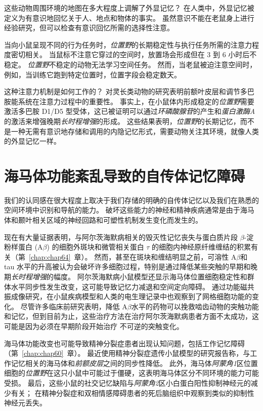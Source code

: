 这些动物周围环境的地图在多大程度上调解了外显记忆？
在人类中，外显记忆被定义为有意识地回忆关于人、地点和物体的事实。
虽然意识不能在老鼠身上进行经验研究，但可以检查有意识回忆所需的选择性注意。


当向小鼠呈现不同的行为任务时，\textit{位置野}的长期稳定性与执行任务所需的注意力程度密切相关。
当鼠标不注意它穿过的空间时，放置场会形成但在 3 到 6 小时后不稳定。
\textit{位置野}不稳定的动物无法学习空间任务。
然而，当老鼠被迫注意空间时，例如，当训练它跑到特定位置时，位置字段会稳定数天。


这种注意力机制是如何工作的？
对灵长类动物的研究表明前额叶皮层和调节多巴胺能系统在注意力过程中的重要性。
事实上，在小鼠体内形成稳定的\textit{位置野}需要激活多巴胺 D1/D5 型受体，这已被证明可以通过\textit{环磷酸腺苷}的产生和\textit{蛋白激酶A}的激活来增强晚期\textit{长时程增强}的形成。
这些结果表明，\textit{位置野}的长期记忆，而不是一种无需有意识地存储和调用的内隐记忆形式，需要动物关注其环境，就像人类的外显记忆一样。



\section{海马体功能紊乱导致的自传体记忆障碍}

我们的认同感在很大程度上取决于我们存储的明确的自传体记忆以及我们在熟悉的空间环境中识别和导航的能力。
破坏这些能力的神经和精神疾病通常是由于海马体和颞叶相关区域的神经回路和可塑性机制发生变化而发生的。


现在有大量证据表明，与阿尔茨海默病相关的毁灭性记忆丧失与蛋白质片段 $\beta$-淀粉样蛋白 (A$\beta$) 的细胞外斑块和微管相关蛋白 $ \tau $ 的细胞内神经原纤维缠结的积累有关（第~\ref{chap:chap64}~章）。
然而，甚至在斑块和缠结明显之前，可溶性 A$\beta$和 tau 水平的升高被认为会破坏许多细胞过程，特别是通过降低某些突触的早期和晚期\textit{长时程增强}的幅度。
阿尔茨海默病小鼠模型还显示海马体位置细胞稳定性和群体水平同步性发生改变，这可能导致记忆力减退和空间定向障碍。
通过功能磁共振成像研究，在小鼠疾病模型和人类的电生理记录中也观察到了网格细胞功能的变化。
尽管许多临床前研究表明，降低 A$\beta$水平的药物可以挽救啮齿动物的突触功能和记忆，但到目前为止，这些治疗方法在治疗阿尔茨海默病患者方面不太成功，这可能是因为必须在早期阶段开始治疗 不可逆的突触变化。


海马体功能改变也可能导致精神分裂症患者出现认知问题，包括工作记忆障碍（第~\ref{chap:chap60}~章）。
最近使用精神分裂症遗传小鼠模型的研究报告称，与工作记忆相关的海马体和\textit{前额皮层}之间的同步性降低。
此外，海马体\textit{阿蒙角1}区位置细胞的\textit{位置野}在这只小鼠中可能过于僵硬，这表明海马体区分不同环境的能力可能受损。
最后，这些小鼠的社交记忆缺陷与\textit{阿蒙角2}区小白蛋白阳性抑制神经元的减少有关；
在精神分裂症和双相情感障碍患者的死后脑组织中观察到类似的抑制性神经元丢失。


